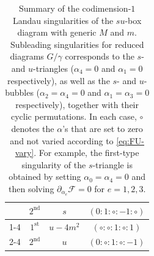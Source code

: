 \documentclass[12pt]{article}
\numberwithin{figure}{section}
\def \F {\mathcal{F}}
\begin{document}
\begin{table}[!t]
\begin{tabular}{c|c|c|c}
\multicolumn{1}{c|}{}                     & \multicolumn{1}{c|}{$2^{\text{nd}}$}                    &  $s$        & $(0 : 1 : \circ : -1 : \circ)$            \\ \cline{1-4}
\multicolumn{1}{c|}{\multirow{2}{*}{\rotatebox{90}{\parbox{3em}{\centering$u$-bub\; \scriptsize$(\alpha_1 =0$, $\alpha_3 =0)$}}}} & $1^{\text{st}}$ & $u - 4m^2$         & $(\circ : \circ : 1 : \circ : 1 )$            \\ \cline{2-4}
\multicolumn{1}{c|}{}                     & \multicolumn{1}{c|}{$2^{\text{nd}}$}                    &  $u$        & $(0 : \circ : 1 : \circ : -1 )$            \\
\end{tabular}
\caption{Summary of the codimension-$1$ Landau singularities of the $su$-box diagram with generic $M$ and $m$. Subleading singularities for reduced diagrams $G/\gamma$ corresponds to the $s$- and $u$-triangles ($\alpha_4 = 0$ and $\alpha_1 = 0$ respectively), as well as the $s$- and $u$-bubbles ($\alpha_2 = \alpha_4 = 0$ and $\alpha_1 = \alpha_3 = 0$ respectively), together with their cyclic permutations. In each case, $\circ$ denotes the $\alpha$'s that are set to zero and not varied according to \eqref{eq:FU-vary}. For example, the first-type singularity of the $s$-triangle is obtained by setting $\alpha_0 = \alpha_4 = 0$ and then solving $\partial_{\alpha_e} \F = 0$ for $e=1,2,3$.}
\label{tab:su-box}
\end{table}
    
\end{document}
